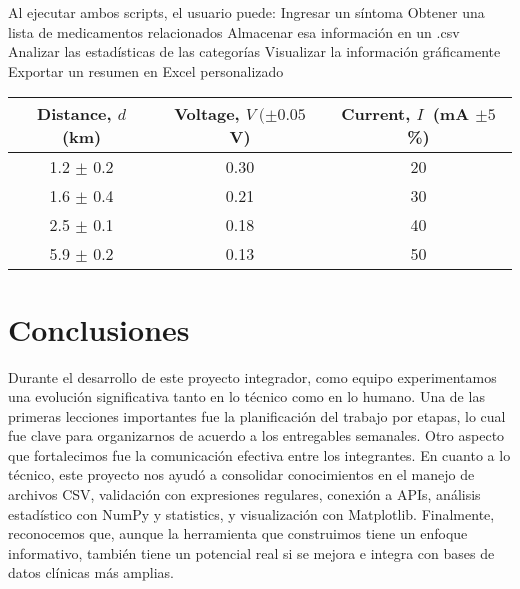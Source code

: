 \documentclass[11pt,letterpaper]{article}
\begin{document}
Al ejecutar ambos scripts, el usuario puede:
Ingresar un síntoma
Obtener una lista de medicamentos relacionados
Almacenar esa información en un .csv
Analizar las estadísticas de las categorías
Visualizar la información gráficamente
Exportar un resumen en Excel personalizado
\lipsum[8-10]
\begin{table}[ht]
\begin{center}
\label{table1} 
\begin{tabular}{ccc}
\hline
\multicolumn{1}{c}{Distance, $d$ (km) } & \multicolumn{1}{c}{Voltage, $V\ (\pm 0.05$ V)} & \multicolumn{1}{c}{Current, $I$\ (mA $\pm 5$\%)}\\
\hline
1.2 $\pm$ 0.2 &  0.30 & 20 \\
1.6 $\pm$ 0.4 &  0.21 & 30 \\
2.5 $\pm$ 0.1 &  0.18 & 40 \\
5.9 $\pm$ 0.2 &  0.13 & 50 \\
\hline
\end{tabular}
\end{center}
\end{table}

\section*{Conclusiones}
Durante el desarrollo de este proyecto integrador, como equipo experimentamos una evolución significativa tanto en lo técnico como en lo humano. Una de las primeras lecciones importantes fue la planificación del trabajo por etapas, lo cual fue clave para organizarnos de acuerdo a los entregables semanales. Otro aspecto que fortalecimos fue la comunicación efectiva entre los integrantes. En cuanto a lo técnico, este proyecto nos ayudó a consolidar conocimientos en el manejo de archivos CSV, validación con expresiones regulares, conexión a APIs, análisis estadístico con NumPy y statistics, y visualización con Matplotlib.
Finalmente, reconocemos que, aunque la herramienta que construimos tiene un enfoque informativo, también tiene un potencial real si se mejora e integra con bases de datos clínicas más amplias.
\bigskip



\end{document}

